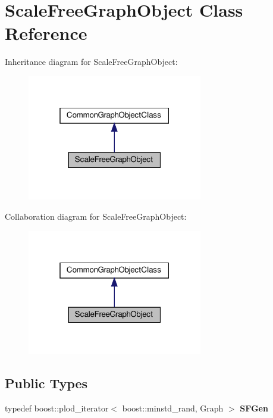 \hypertarget{classScaleFreeGraphObject}{}\section{Scale\+Free\+Graph\+Object Class Reference}
\label{classScaleFreeGraphObject}


Inheritance diagram for Scale\+Free\+Graph\+Object\+:
\nopagebreak
\begin{figure}[H]
\begin{center}
\leavevmode
\includegraphics[width=217pt]{classScaleFreeGraphObject__inherit__graph}
\end{center}
\end{figure}


Collaboration diagram for Scale\+Free\+Graph\+Object\+:
\nopagebreak
\begin{figure}[H]
\begin{center}
\leavevmode
\includegraphics[width=217pt]{classScaleFreeGraphObject__coll__graph}
\end{center}
\end{figure}
\subsection*{Public Types}
\begin{DoxyCompactItemize}
\item 
\mbox{\label{classScaleFreeGraphObject_a1f93c4d2a33127b8a87b2a6e05a65887}} 
typedef boost\+::plod\+\_\+iterator$<$ boost\+::minstd\+\_\+rand, Graph $>$ {\bfseries S\+F\+Gen}
\end{DoxyCompactItemize}
